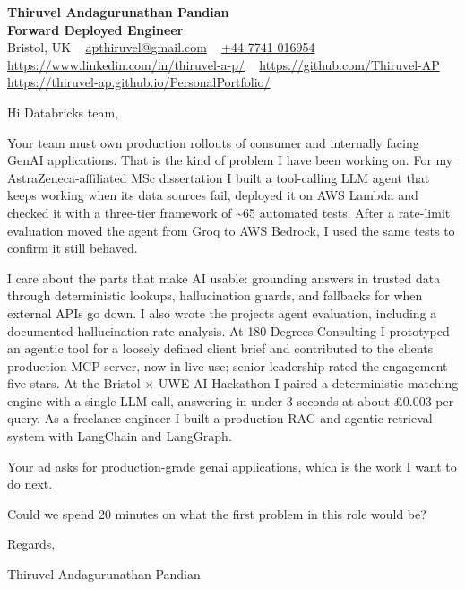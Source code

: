 \documentclass[11pt,a4paper]{article}
\begin{document}
\raggedright
\pagestyle{empty}

\begin{center}
    {\LARGE \color{linkblue} \textbf{Thiruvel Andagurunathan Pandian}}\\[0.2cm]
    {\color{headernavy}\small\textbf{Forward Deployed Engineer}}\\[0.2cm]
    {\small Bristol, UK\nobreak\ \,\textbar\, \href{mailto:apthiruvel@gmail.com}{apthiruvel@gmail.com}\nobreak\ \,\textbar\, \href{tel:+447741016954}{+44 7741 016954}\nobreak\ \,\textbar\, \href{https://www.linkedin.com/in/thiruvel-a-p/}{https://www.linkedin.com/in/thiruvel-a-p/}\nobreak\ \,\textbar\, \href{https://github.com/Thiruvel-AP}{https://github.com/Thiruvel-AP}\nobreak\ \,\textbar\, \href{https://thiruvel-ap.github.io/PersonalPortfolio/}{https://thiruvel-ap.github.io/PersonalPortfolio/}}

\end{center}

\vspace{0.4cm}

\noindent
Hi Databricks team,

Your team must own production rollouts of consumer and internally facing GenAI applications. That is the kind of problem I have been working on. For my AstraZeneca-affiliated MSc dissertation I built a tool-calling LLM agent that keeps working when its data sources fail, deployed it on AWS Lambda and checked it with a three-tier framework of \textasciitilde{}65 automated tests. After a rate-limit evaluation moved the agent from Groq to AWS Bedrock, I used the same tests to confirm it still behaved.

I care about the parts that make AI usable: grounding answers in trusted data through deterministic lookups, hallucination guards, and fallbacks for when external APIs go down. I also wrote the project\textquotesingle{}s agent evaluation, including a documented hallucination-rate analysis. At 180 Degrees Consulting I prototyped an agentic tool for a loosely defined client brief and contributed to the client\textquotesingle{}s production MCP server, now in live use; senior leadership rated the engagement five stars. At the Bristol × UWE AI Hackathon I paired a deterministic matching engine with a single LLM call, answering in under 3 seconds at about £0.003 per query. As a freelance engineer I built a production RAG and agentic retrieval system with LangChain and LangGraph.

Your ad asks for production-grade genai applications, which is the work I want to do next.

Could we spend 20 minutes on what the first problem in this role would be?

\vspace{0.5cm}

Regards,

Thiruvel Andagurunathan Pandian
\end{document}
